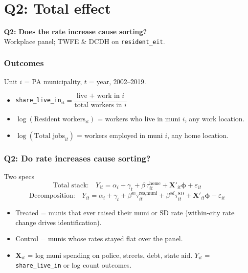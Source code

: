 \documentclass[xcolor = x11names, compress, aspectratio = 169]{beamer}
\renewcommand{\(}{\begin{columns}}
\renewcommand{\)}{\end{columns}}
\newcommand{\<}[1]{\begin{column}{#1}}
\renewcommand{\>}{\end{column}}
\begin{document}
\section{Q2: Total effect}

\begin{frame}[plain]
    \centering
    \vfill
    \Large \textbf{Q2: Does the rate increase cause sorting?}
    \normalsize
    \vspace{0.4cm}\\
    Workplace panel; TWFE \& DCDH on \texttt{resident\_eit}.
    \vfill
\end{frame}

\begin{frame}
\frametitle{Outcomes}
    Unit $i$ = PA municipality, $t$ = year, 2002--2019.
    \begin{itemize}\setlength{\itemsep}{0.25cm}
        \item \texttt{share\_live\_in}$_{it} = \dfrac{\text{live + work in } i}{\text{total workers in } i}$
        \item $\log(\text{Resident workers}_{it})$
        = workers who live in muni $i$, any work location.
        \item $\log(\text{Total jobs}_{it})$
        = workers employed in muni $i$, any home location.
    \end{itemize}
\end{frame}

\begin{frame}
\frametitle{Q2: Do rate increases cause sorting?}
    Two specs
    \[
    \text{Total stack:}\quad Y_{it} = \alpha_i + \gamma_t + \beta\,\tau^{\text{home}}_{it} + \mathbf{X}'_{it}\boldsymbol{\phi} + \varepsilon_{it}
    \]
    \[
    \text{Decomposition:}\quad Y_{it} = \alpha_i + \gamma_t + \beta^{m}\tau^{\text{res,muni}}_{it} + \beta^{sd}\tau^{\text{SD}}_{it} + \mathbf{X}'_{it}\boldsymbol{\phi} + \varepsilon_{it}
    \]
    \footnotesize
    \begin{itemize}
    \item Treated = munis that ever raised their muni or SD rate (within-city
    rate change drives identification). 
    \item Control = munis whose rates
    stayed flat over the panel. 
    \item $\mathbf{X}_{it}$ = log muni spending
    on police, streets, debt, state aid. $Y_{it}$ = \texttt{share\_live\_in}
    or log count outcomes.
    \end{itemize}
    
\end{frame}
\end{document}
